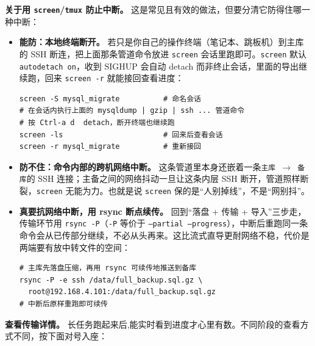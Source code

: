 \documentclass[12pt,UTF8]{ctexbook}
\begin{document}
\textbf{关于用 \texttt{screen}/\texttt{tmux} 防止中断。} 这是常见且有效的做法，但要分清它防得住哪一种中断：

\begin{itemize}[leftmargin=2cm]
  \item \textbf{能防：本地终端断开。} 若只是你自己的操作终端（笔记本、跳板机）到主库的 SSH 断连，把上面那条管道命令放进 \texttt{screen} 会话里跑即可。\texttt{screen} 默认 \texttt{autodetach on}，收到 SIGHUP 会自动 detach 而非终止会话，里面的导出继续跑，回来 \texttt{screen -r} 就能接回查看进度：

\begin{lstlisting}
screen -S mysql_migrate          # 命名会话
# 在会话内执行上面的 mysqldump | gzip | ssh ... 管道命令
# 按 Ctrl-a d  detach，断开终端也继续跑
screen -ls                       # 回来后查看会话
screen -r mysql_migrate          # 重新接回
\end{lstlisting}

  \item \textbf{防不住：命令内部的跨机网络中断。} 这条管道里本身还嵌着一条\texttt{主库 $\to$ 备库}的 SSH 连接；主备之间的网络抖动一旦让这条内层 SSH 断开，管道照样断裂，\texttt{screen} 无能为力。也就是说 \texttt{screen} 保的是“人别掉线”，不是“网别抖”。
  \item \textbf{真要抗网络中断，用 rsync 断点续传。} 回到“落盘 + 传输 + 导入”三步走，传输环节用 \texttt{rsync -P}（\texttt{-P} 等价于 \texttt{--partial --progress}），中断后重跑同一条命令会从已传部分继续，不必从头再来。这比流式直导更耐网络不稳，代价是两端要有放中转文件的空间：

\begin{lstlisting}
# 主库先落盘压缩，再用 rsync 可续传地推送到备库
rsync -P -e ssh /data/full_backup.sql.gz \
  root@192.168.4.101:/data/full_backup.sql.gz
# 中断后原样重跑即可续传
\end{lstlisting}

\end{itemize}

\textbf{查看传输详情。} 长任务跑起来后,能实时看到进度才心里有数。不同阶段的查看方式不同，按下面对号入座：
\end{document}
